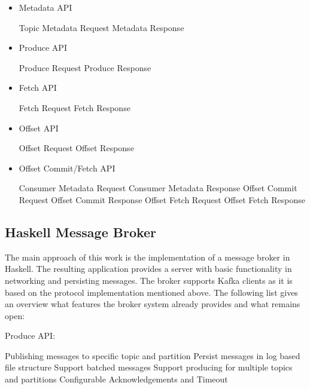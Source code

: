 \begin{itemize}
    \item Metadata API
    \begin{itemize}
        \tick Topic Metadata Request
        \tick Metadata Response
    \end{itemize}
    \item Produce API
    \begin{itemize}
        \tick Produce Request
        \tick Produce Response
    \end{itemize}
    \item Fetch API
    \begin{itemize}
        \tick Fetch Request
        \tick Fetch Response
    \end{itemize}
    \item Offset API
    \begin{itemize}
        \fail Offset Request
        \fail Offset Response
    \end{itemize}
    \item Offset Commit/Fetch API
    \begin{itemize}
        \fail Consumer Metadata Request
        \fail Consumer Metadata Response
        \fail Offset Commit Request
        \fail Offset Commit Response
        \fail Offset Fetch Request
        \fail Offset Fetch Response
    \end{itemize}
\end{itemize}

\subsection{Haskell Message Broker}
The main approach of this work is the implementation of a message broker in
Haskell. The resulting application provides a server with basic functionality
in networking and persisting messages. The broker supports Kafka clients as
it is based on the protocol implementation mentioned above. The following list
gives an overview what features the broker system already provides and what
remains open:

Produce API: 
\begin{itemize}
        \tick Publishing messages to specific topic and partition
        \tick Persist messages in log based file structure
        \tick Support batched messages 
        \tick Support producing for multiple topics and partitions
        \fail Configurable Acknowledgements and Timeout
\end{itemize}


